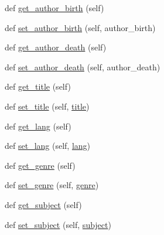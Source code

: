 \begin{DoxyCompactItemize}
\item 
def \hyperlink{class_bridges_1_1data__src__dependent_1_1book_1_1_book_a124505d503ec1b2dc2423fc930b518dc}{get\+\_\+author\+\_\+birth} (self)
\item 
def \hyperlink{class_bridges_1_1data__src__dependent_1_1book_1_1_book_ad5ccfa1c3d1894aea2afa1601b9502f4}{set\+\_\+author\+\_\+birth} (self, author\+\_\+birth)
\item 
def \hyperlink{class_bridges_1_1data__src__dependent_1_1book_1_1_book_a970cf0a7b3ddf15ecc08659186596499}{get\+\_\+author\+\_\+death} (self)
\item 
def \hyperlink{class_bridges_1_1data__src__dependent_1_1book_1_1_book_a16e6ce629fe1f8ef36c0c323c635c2bb}{set\+\_\+author\+\_\+death} (self, author\+\_\+death)
\item 
def \hyperlink{class_bridges_1_1data__src__dependent_1_1book_1_1_book_a38cbdcd591300d19abf09c7743b4b02f}{get\+\_\+title} (self)
\item 
def \hyperlink{class_bridges_1_1data__src__dependent_1_1book_1_1_book_a3ac4697362103e14b6a5330c64af6c24}{set\+\_\+title} (self, \hyperlink{class_bridges_1_1data__src__dependent_1_1book_1_1_book_a210b83d20030cb1da8e8d2a3a2279886}{title})
\item 
def \hyperlink{class_bridges_1_1data__src__dependent_1_1book_1_1_book_a63643b39d8b8d425b3c1a64e439434f5}{get\+\_\+lang} (self)
\item 
def \hyperlink{class_bridges_1_1data__src__dependent_1_1book_1_1_book_a56c943166d831749e8f24dbb0974a497}{set\+\_\+lang} (self, \hyperlink{class_bridges_1_1data__src__dependent_1_1book_1_1_book_a48743bf2013442dc0cd6fd288c2dd72b}{lang})
\item 
def \hyperlink{class_bridges_1_1data__src__dependent_1_1book_1_1_book_a01017b5cfb48e563f66c0aaf37944ec2}{get\+\_\+genre} (self)
\item 
def \hyperlink{class_bridges_1_1data__src__dependent_1_1book_1_1_book_a41e3edeea83ec89d27e6613510de3a9a}{set\+\_\+genre} (self, \hyperlink{class_bridges_1_1data__src__dependent_1_1book_1_1_book_a9c14172cd98eebd41d3bbe3aaaae979b}{genre})
\item 
def \hyperlink{class_bridges_1_1data__src__dependent_1_1book_1_1_book_afaa240b38779771fab1430cc2c95a3a9}{get\+\_\+subject} (self)
\item 
def \hyperlink{class_bridges_1_1data__src__dependent_1_1book_1_1_book_ab1dda09edc3c9152e45c2aadcc9dce67}{set\+\_\+subject} (self, \hyperlink{class_bridges_1_1data__src__dependent_1_1book_1_1_book_a90984ae814d6f7dc320daadde81f2580}{subject})

\end{DoxyCompactItemize}
